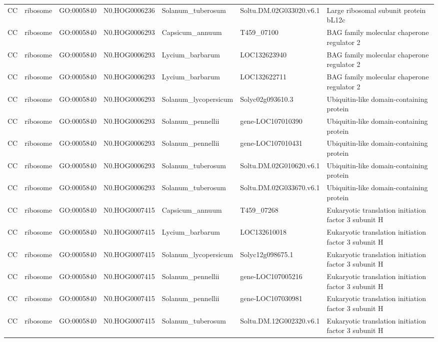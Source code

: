 \begin{table}
\begin{tabular}[t]{lllllll}
CC & ribosome & GO:0005840 & N0.HOG0006236 & Solanum\_tuberosum & Soltu.DM.02G033020.v6.1 & Large ribosomal subunit protein bL12c\\
CC & ribosome & GO:0005840 & N0.HOG0006293 & Capsicum\_annuum & T459\_07100 & BAG family molecular chaperone regulator 2\\
CC & ribosome & GO:0005840 & N0.HOG0006293 & Lycium\_barbarum & LOC132623940 & BAG family molecular chaperone regulator 2\\
CC & ribosome & GO:0005840 & N0.HOG0006293 & Lycium\_barbarum & LOC132622711 & BAG family molecular chaperone regulator 2\\
CC & ribosome & GO:0005840 & N0.HOG0006293 & Solanum\_lycopersicum & Solyc02g093610.3 & Ubiquitin-like domain-containing protein\\
CC & ribosome & GO:0005840 & N0.HOG0006293 & Solanum\_pennellii & gene-LOC107010390 & Ubiquitin-like domain-containing protein\\
CC & ribosome & GO:0005840 & N0.HOG0006293 & Solanum\_pennellii & gene-LOC107010431 & Ubiquitin-like domain-containing protein\\
CC & ribosome & GO:0005840 & N0.HOG0006293 & Solanum\_tuberosum & Soltu.DM.02G010620.v6.1 & Ubiquitin-like domain-containing protein\\
CC & ribosome & GO:0005840 & N0.HOG0006293 & Solanum\_tuberosum & Soltu.DM.02G033670.v6.1 & Ubiquitin-like domain-containing protein\\
CC & ribosome & GO:0005840 & N0.HOG0007415 & Capsicum\_annuum & T459\_07268 & Eukaryotic translation initiation factor 3 subunit H\\
CC & ribosome & GO:0005840 & N0.HOG0007415 & Lycium\_barbarum & LOC132610018 & Eukaryotic translation initiation factor 3 subunit H\\
CC & ribosome & GO:0005840 & N0.HOG0007415 & Solanum\_lycopersicum & Solyc12g098675.1 & Eukaryotic translation initiation factor 3 subunit H\\
CC & ribosome & GO:0005840 & N0.HOG0007415 & Solanum\_pennellii & gene-LOC107005216 & Eukaryotic translation initiation factor 3 subunit H\\
CC & ribosome & GO:0005840 & N0.HOG0007415 & Solanum\_pennellii & gene-LOC107030981 & Eukaryotic translation initiation factor 3 subunit H\\
CC & ribosome & GO:0005840 & N0.HOG0007415 & Solanum\_tuberosum & Soltu.DM.12G002320.v6.1 & Eukaryotic translation initiation factor 3 subunit H\\

\end{tabular}
\end{table}
